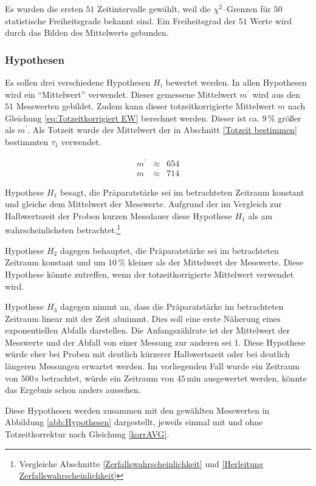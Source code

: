 \documentclass[12pt,a4paper]{scrartcl}
\numberwithin{equation}{section} %
\begin{document}
Es wurden die ersten $51$ Zeitintervalle gewählt, weil die $\chi^2$--Grenzen für $50$ statistische Freiheitsgrade bekannt sind. \cite{Kapur} Ein Freiheitsgrad der $51$ Werte wird durch das Bilden des Mittelwerts gebunden.

\subsubsection{Hypothesen}
\label{Hypothesen}
Es sollen drei verschiedene Hypothesen $H_i$ bewertet werden. In allen Hypothesen wird ein ``Mittelwert'' verwendet. Dieser gemessene Mittelwert $m^\prime$ wird aus den $51$ Messwerten gebildet. Zudem kann dieser totzeitkorrigierte Mittelwert $m$ nach Gleichung \ref{eq:Totzeitkorrigiert EW} berechnet werden. Dieser ist ca. $9\,\%$ größer als $m^\prime$. Als Totzeit wurde der Mittelwert der in Abschnitt \ref{Totzeit bestimmen} bestimmten $\tau_1$ verwendet.

\begin{eqnarray}
	m^\prime &\approx& 654 \\
	m &\approx& 714
\end{eqnarray}

Hypothese $H_1$ besagt, die Präparatstärke sei im betrachteten Zeitraum konstant und gleiche dem Mittelwert der Messwerte. Aufgrund der im Vergleich zur Halbwertszeit der Proben kurzen Messdauer diese Hypothese $H_1$ als am wahrscheinlichsten betrachtet.\footnote{Vergleiche Abschnitte \ref{Zerfallswahrscheinlichkeit} und \ref{Herleitung Zerfallswahrscheinlichkeit}}

Hypothese $H_2$ dagegen behauptet, die Präparatstärke sei im betrachteten Zeitraum konstant und um $10\,\%$ kleiner als der Mittelwert der Messwerte. Diese Hypothese könnte zutreffen, wenn der totzeitkorrigierte Mittelwert verwendet wird.

Hypothese $H_3$ dagegen nimmt an, dass die Präparatstärke im betrachteten Zeitraum linear mit der Zeit abnimmt. Dies soll eine erste Näherung eines exponentiellen Abfalls darstellen. Die Anfangszählrate ist der Mittelwert der Messwerte und der Abfall von einer Messung zur anderen sei $1$. Diese Hypothese würde eher bei Proben mit deutlich kürzerer Halbwertszeit oder bei deutlich längeren Messungen erwartet werden. Im vorliegenden Fall wurde ein Zeitraum von $500\mathrm{\,s}$ betrachtet, würde ein Zeitraum von $45\mathrm{\,min}$ ausgewertet werden, könnte das Ergebnis schon anders aussehen.

Diese Hypothesen werden zusammen mit den gewählten Messwerten in Abbildung \ref{abb:Hypothesen} dargestellt, jeweils einmal mit und ohne Totzeitkorrektur nach Gleichung \eqref{korrAVG}.
\end{document}
